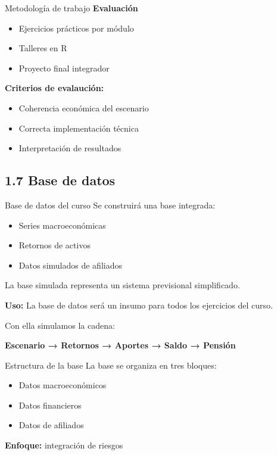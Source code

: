 \documentclass{beamer}
\begin{document}
\begin{frame}[t]{Metodología de trabajo}
\textbf{Evaluación}
\begin{itemize}
    \item Ejercicios prácticos por módulo
    \item Talleres en R
    \item Proyecto final integrador
\end{itemize}

\vspace{0.5cm}
\textbf{Criterios de evalaución:}

\begin{itemize}
    \item Coherencia económica del escenario
    \item Correcta implementación técnica
    \item Interpretación de resultados
\end{itemize}
  
\end{frame}
\subsection{1.7 Base de datos}
\begin{frame}[t]{Base de datos del curso}
Se construirá una base integrada:

\begin{itemize}
\item Series macroeconómicas
\item Retornos de activos
\item Datos simulados de afiliados
\end{itemize}

\vspace{0.5cm}
La base simulada representa un sistema previsional simplificado. 

\vspace{0.5cm}
\textbf{Uso:} La base de datos será un insumo para todos los ejercicios del curso.

\vspace{0.3cm}
Con ella simulamos la cadena:

\centering
\textbf{Escenario → Retornos → Aportes → Saldo → Pensión}
\end{frame}

\begin{frame}[t]{Estructura de la base}
La base se organiza en tres bloques:

\begin{itemize}
\item Datos macroeconómicos
\item Datos financieros
\item Datos de afiliados
\end{itemize}

\vspace{0.5cm}
\textbf{Enfoque:} integración de riesgos
\end{frame}
\end{document}
